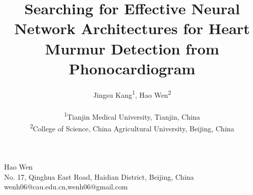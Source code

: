 \documentclass[twocolumn]{cinc}
\title{Searching for Effective Neural Network Architectures for Heart Murmur Detection from Phonocardiogram}
\author{Jingsu Kang\textsuperscript{1},
Hao Wen\textsuperscript{2} \\ \ \\
\textsuperscript{1}Tianjin Medical University, Tianjin, China\\
\textsuperscript{2}College of Science, China Agricultural University, Beijing, China
}
\begin{document}
\maketitle






















\begin{correspondence}
Hao Wen\\
No. 17, Qinghua East Road, Haidian District, Beijing, China\\
wenh06@cau.edu.cn,wenh06@gmail.com
\end{correspondence}

\balance
\end{document}
